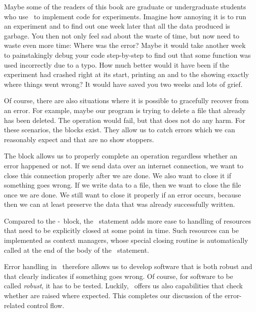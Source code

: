 Maybe some of the readers of this book are graduate or undergraduate students who use \python\ to implement code for experiments.
Imagine how annoying it is to run an experiment and to find out one week later that all the data produced is garbage.
You then not only feel sad about the waste of time, but now need to waste even more time:
Where was the error?
Maybe it would take another week to painstakingly debug your code step-by-step to find out that some function was used incorrectly due to a typo.
How much better would it have been if the experiment had crashed right at its start, printing an  and  to the  showing exactly where things went wrong?
It would have saved you two weeks and lots of grief.

Of course, there are also situations where it is possible to gracefully recover from an error.
For example, maybe our program is trying to delete a file that already has been deleted.
The operation would fail, but that does not do any harm.
For these scenarios, the  blocks exist.
They allow us to catch errors which we can reasonably expect and that are no show stoppers.

The  block allows us to properly complete an operation regardless whether an error happened or not.
If we send data over an internet connection, we want to close this connection properly after we are done.
We also want to close it if something goes wrong.
If we write data to a file, then we want to close the file once we are done.
We still want to close it properly if an error occurs, because then we can at least preserve the data that was already successfully written.

Compared to the -~block, the ~statement adds more ease to handling of resources that need to be explicitly closed at some point in time.
Such resources can be implemented as context managers, whose special closing routine is automatically called at the end of the body of the ~statement.

Error handling in \python\ therefore allows us to develop software that is both robust and that clearly indicates if something goes wrong.
Of course, for software to be called \emph{robust}, it has to be tested.
Luckily, \pytest\ offers us also  capabilities that check whether  are raised where expected.
This completes our discussion of the error-related control flow.%
\endhsection%
%
\FloatBarrier%
\endhsection%
%
